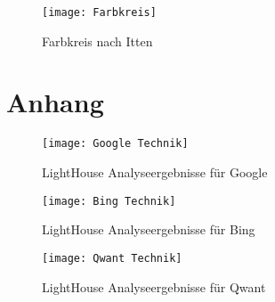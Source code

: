 \begin{appendix}
  \begin{figure}[h]
    \centering
    \texttt{[image: Farbkreis]}
    \caption{Farbkreis nach Itten\autocite{Farbkreis}}
    \label{fig:farbkreis}
  \end{figure}
  \section{Anhang}
  \begin{figure}[h]
    \centering
    \texttt{[image: Google Technik]}
    \caption{LightHouse Analyseergebnisse für Google}
  \end{figure}
  \begin{figure}[h]
    \centering
    \texttt{[image: Bing Technik]}
    \caption{LightHouse Analyseergebnisse für Bing}
  \end{figure}
  \begin{figure}[h]
    \centering
    \texttt{[image: Qwant Technik]}
    \caption{LightHouse Analyseergebnisse für Qwant}
  \end{figure}
\end{appendix}